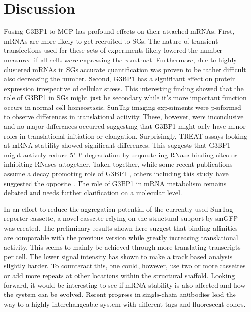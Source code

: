 \chapter{Discussion}


Fusing G3BP1 to MCP has profound effects on their attached mRNAs.
First, mRNAs are more likely to get recruited to SGs.
The nature of transient transfections used for these sets of experiments likely
    lowered the number measured if all cells were expressing the construct.
Furthermore, due to highly clustered mRNAs in SGs accurate quantification was proven to be
    rather difficult also decreasing the number.
Second, G3BP1 has a significant effect on protein expression irrespective of cellular stress.
This interesting finding showed that the role of G3BP1 in SGs might just be secondary while
    it's more important function occurs in normal cell homeostasis.
SunTag imaging experiments were performed to observe differences in translational activity.
These, however, were inconclusive and no major differences occurred suggesting that
    G3BP1 might only have minor roles in translational initiation or elongation.
Surprisingly, TREAT assays looking at mRNA stability showed significant differences.
This suggests that G3BP1 might actively reduce 5'-3' degradation by sequestering
    RNase binding sites or inhibiting RNases altogether.
Taken together, while some recent publications assume a decay promoting role of G3BP1 \cite{fischer_structure-mediated_2020, tourriere_rasgap-associated_2001},
    others including this study have suggested the opposite \cite{aulas_g3bp1_2015, bley_stress_2015, laver_rna-binding_2020}.
The role of G3BP1 in mRNA metabolism remains debated and needs further clarification on a molecular level.

In an effort to reduce the aggregation potential of the currently used SunTag reporter cassette,
    a novel cassette relying on the structural support by smGFP was created.
The preliminary results shown here suggest that binding affinities are comparable with the previous
    version while greatly increasing translational activity.
This seems to mainly be achieved through more translating transcripts per cell.
The lower signal intensity has shown to make a track based analysis slightly harder.
To counteract this, one could, however, use two or more cassettes or add more repeats at
    other locations within the structural scaffold.
Looking forward, it would be interesting to see if mRNA stability is also affected and how the
    system can be evolved.
Recent progress in single-chain antibodies lead the way to a highly interchangeable system
    with different tags and fluorescent colors.
